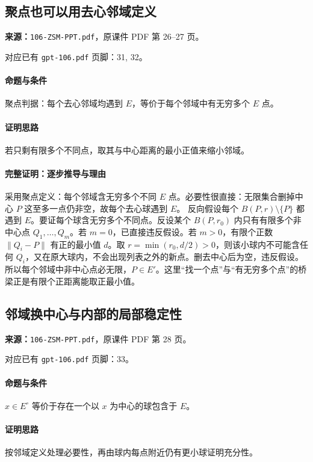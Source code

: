 \clearpage\subsection{聚点也可以用去心邻域定义}
\textbf{来源：}\texttt{106-ZSM-PPT.pdf}，原课件 PDF 第 26--27 页。\par
对应已有 \texttt{gpt-106.pdf} 页脚：31, 32。\par
\paragraph{命题与条件}聚点判据：每个去心邻域均遇到 $E$，等价于每个邻域中有无穷多个 $E$ 点。
\paragraph{证明思路}若只剩有限多个不同点，取其与中心距离的最小正值来缩小邻域。
\paragraph{完整证明：逐步推导与理由}

采用聚点定义：每个邻域含无穷多个不同 $E$ 点。必要性很直接：无限集合删掉中心 $P$ 这至多一点仍非空，故每个去心球遇到 $E$。
反向假设每个 $B(P,r)\setminus\{P\}$ 都遇到 $E$。要证每个球含无穷多个不同点。反设某个 $B(P,r_0)$ 内只有有限多个非中心点 $Q_1,\ldots,Q_m$。若 $m=0$，已直接违反假设。若 $m>0$，有限个正数 $\|Q_i-P\|$ 有正的最小值 $d$。取 $r=\min(r_0,d/2)>0$，则该小球内不可能含任何 $Q_i$，又在原大球内，不会出现列表之外的新点。删去中心后为空，违反假设。
所以每个邻域中非中心点必无限，$P\in E'$。这里“找一个点”与“有无穷多个点”的桥梁正是有限个正距离能取正最小值。

\clearpage\subsection{邻域换中心与内部的局部稳定性}
\textbf{来源：}\texttt{106-ZSM-PPT.pdf}，原课件 PDF 第 28 页。\par
对应已有 \texttt{gpt-106.pdf} 页脚：33。\par
\paragraph{命题与条件}$x\in E^\circ$ 等价于存在一个以 $x$ 为中心的球包含于 $E$。
\paragraph{证明思路}按邻域定义处理必要性，再由球内每点附近仍有更小球证明充分性。
